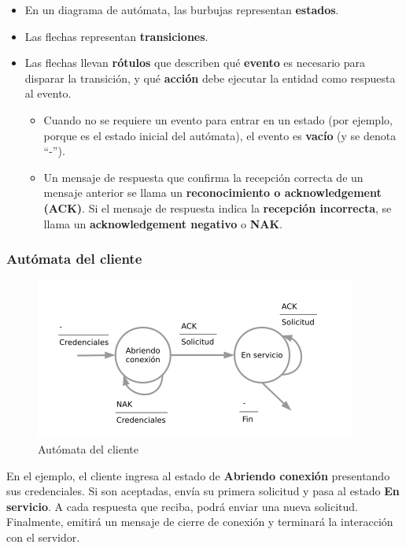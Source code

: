 \documentclass[spanish,a4paper,]{article}
\providecommand{\tightlist}{%
  \setlength{\itemsep}{0pt}\setlength{\parskip}{0pt}}
\begin{document}
\begin{itemize}
\item
  En un diagrama de autómata, las burbujas representan \textbf{estados}.
\item
  Las flechas representan \textbf{transiciones}.
\item
  Las flechas llevan \textbf{rótulos} que describen qué \textbf{evento}
  es necesario para disparar la transición, y qué \textbf{acción} debe
  ejecutar la entidad como respuesta al evento.

  \begin{itemize}
  \tightlist
  \item
    Cuando no se requiere un evento para entrar en un estado (por
    ejemplo, porque es el estado inicial del autómata), el evento es
    \textbf{vacío} (y se denota ``-'').
  \item
    Un mensaje de respuesta que confirma la recepción correcta de un
    mensaje anterior se llama un \textbf{reconocimiento o
    acknowledgement (ACK)}. Si el mensaje de respuesta indica la
    \textbf{recepción incorrecta}, se llama un \textbf{acknowledgement
    negativo} o \textbf{NAK}.
  \end{itemize}
\end{itemize}

\hypertarget{autuxf3mata-del-cliente}{%
\subsubsection{Autómata del cliente}\label{autuxf3mata-del-cliente}}

\begin{figure}
\centering
\includegraphics{img/protocolo-cliente.png}
\caption{Autómata del cliente}
\end{figure}

En el ejemplo, el cliente ingresa al estado de \textbf{Abriendo
conexión} presentando sus credenciales. Si son aceptadas, envía su
primera solicitud y pasa al estado \textbf{En servicio}. A cada
respuesta que reciba, podrá enviar una nueva solicitud. Finalmente,
emitirá un mensaje de cierre de conexión y terminará la interacción con
el servidor.
\end{document}
